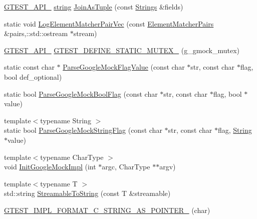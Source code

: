 \begin{DoxyCompactItemize}
\item 
\hyperlink{gtest-port_8h_aa73be6f0ba4a7456180a94904ce17790}{G\+T\+E\+S\+T\+\_\+\+A\+P\+I\+\_\+} \hyperlink{namespacetesting_1_1internal_a8e8ff5b11e64078831112677156cb111}{string} \hyperlink{namespacetesting_1_1internal_a61d60981533cb0875bad9025e0d98b74}{Join\+As\+Tuple} (const \hyperlink{namespacetesting_1_1internal_a7706b17f05f4b49e351b052ae4e05073}{Strings} \&fields)
\item 
static void \hyperlink{namespacetesting_1_1internal_a482c05e696259e3326a42d2e5e815a2d}{Log\+Element\+Matcher\+Pair\+Vec} (const \hyperlink{namespacetesting_1_1internal_a0038618710c01a71150887dc7cfb0a29}{Element\+Matcher\+Pairs} \&pairs,\+::std\+::ostream $\ast$stream)
\item 
\hyperlink{gtest-port_8h_aa73be6f0ba4a7456180a94904ce17790}{G\+T\+E\+S\+T\+\_\+\+A\+P\+I\+\_\+} \hyperlink{namespacetesting_1_1internal_a8c4aa7be8daa7b60e293071d70a89584}{G\+T\+E\+S\+T\+\_\+\+D\+E\+F\+I\+N\+E\+\_\+\+S\+T\+A\+T\+I\+C\+\_\+\+M\+U\+T\+E\+X\+\_\+} (g\+\_\+gmock\+\_\+mutex)
\item 
static const char $\ast$ \hyperlink{namespacetesting_1_1internal_af9eac3bda47b1fa0b8e43d1d1d3a0b16}{Parse\+Google\+Mock\+Flag\+Value} (const char $\ast$str, const char $\ast$flag, bool def\+\_\+optional)
\item 
static bool \hyperlink{namespacetesting_1_1internal_a137bff8177d6158f59ab4ce603577293}{Parse\+Google\+Mock\+Bool\+Flag} (const char $\ast$str, const char $\ast$flag, bool $\ast$value)
\item 
{\footnotesize template$<$typename String $>$ }\\static bool \hyperlink{namespacetesting_1_1internal_afb359266feb817d9943854b76574817d}{Parse\+Google\+Mock\+String\+Flag} (const char $\ast$str, const char $\ast$flag, \hyperlink{classtesting_1_1internal_1_1String}{String} $\ast$value)
\item 
{\footnotesize template$<$typename Char\+Type $>$ }\\void \hyperlink{namespacetesting_1_1internal_a3823844199df88af9493026031cf7744}{Init\+Google\+Mock\+Impl} (int $\ast$argc, Char\+Type $\ast$$\ast$argv)
\item 
{\footnotesize template$<$typename T $>$ }\\std\+::string \hyperlink{namespacetesting_1_1internal_aad4beed95d0846e6ffc5da0978ef3bb9}{Streamable\+To\+String} (const T \&streamable)
\item 
\hyperlink{namespacetesting_1_1internal_a3682f962ae0ec1c0eca6444ca0a09e91}{G\+T\+E\+S\+T\+\_\+\+I\+M\+P\+L\+\_\+\+F\+O\+R\+M\+A\+T\+\_\+\+C\+\_\+\+S\+T\+R\+I\+N\+G\+\_\+\+A\+S\+\_\+\+P\+O\+I\+N\+T\+E\+R\+\_\+} (char)
$$
\end{DoxyCompactItemize}
